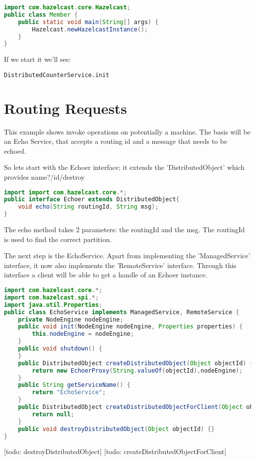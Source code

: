 \begin{lstlisting}[language=java]
import com.hazelcast.core.Hazelcast;
public class Member {
    public static void main(String[] args) {
        Hazelcast.newHazelcastInstance();
    }
}
\end{lstlisting}
If we start it we'll see:
\begin{lstlisting}
DistributedCounterService.init
\end{lstlisting}

\section{Routing Requests}
This example shows invoke operations on potentially a machine. The basis will be an Echo Service, that accepts a routing id and a message that needs to be echoed.

So lets start with the Echoer interface; it extends the 'DistributedObject' which provides name?/id/destroy
\begin{lstlisting}[language=java]
import import com.hazelcast.core.*;
public interface Echoer extends DistributedObject{
    void echo(String routingId, String msg);
}
\end{lstlisting}
The echo method takes 2 parameters: the routingId and the msg. The routingId is used to find the correct partition. 

The next step is the EchoService. Apart from implementing the 'ManagedService' interface, it now also implements the 'RemoteService' interface. Through this interface a client will be able to get a handle of an Echoer instance.
\begin{lstlisting}[language=java]
import com.hazelcast.core.*;
import com.hazelcast.spi.*;
import java.util.Properties;
public class EchoService implements ManagedService, RemoteService {
    private NodeEngine nodeEngine;
    public void init(NodeEngine nodeEngine, Properties properties) {
        this.nodeEngine = nodeEngine;
    }
    public void shutdown() {
    }
    public DistributedObject createDistributedObject(Object objectId) {
        return new EchoerProxy(String.valueOf(objectId),nodeEngine);
    }
    public String getServiceName() {
        return "EchoService";
    }
    public DistributedObject createDistributedObjectForClient(Object objectId) {
        return null;
    }
    public void destroyDistributedObject(Object objectId) {}
}
\end{lstlisting}
[todo: destroyDistributedObject]
[todo: createDistributedObjectForClient]


